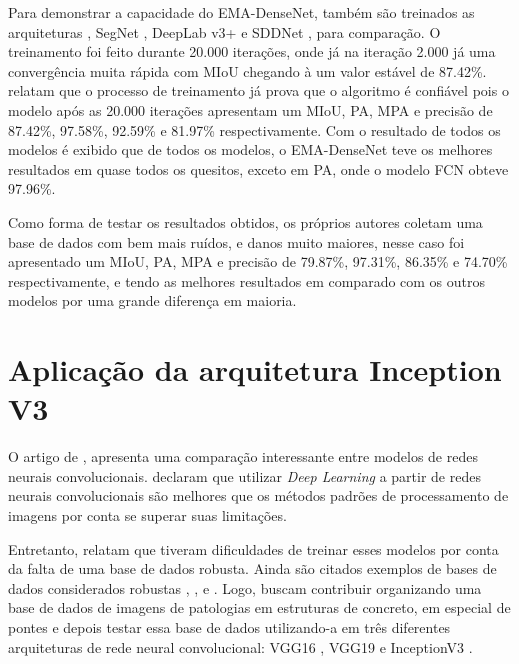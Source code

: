 Para demonstrar a capacidade do EMA-DenseNet, também são treinados as arquiteturas  \cite{yang2018automatic}, SegNet \cite{badrinarayanan2017segnet}, DeepLab v3+ \cite{chen2018encoder} e SDDNet \cite{choi2019sddnet}, para comparação. O treinamento  foi feito durante 20.000 iterações, onde já na iteração 2.000 já uma convergência muita rápida com MIoU chegando à um valor estável de 87.42\%. 
 relatam que o processo de treinamento já prova que o algoritmo é confiável pois o modelo após as 20.000 iterações apresentam um MIoU, PA, MPA e precisão de 87.42\%, 97.58\%, 92.59\% e 81.97\% respectivamente. 
Com o resultado de todos os modelos é exibido que de todos os modelos, o EMA-DenseNet teve os melhores resultados em quase todos os quesitos, exceto em PA, onde o modelo FCN obteve 97.96\%.

Como forma de testar os resultados obtidos, os próprios autores coletam uma base de dados com bem mais ruídos, e danos muito maiores, nesse caso foi apresentado um MIoU, PA, MPA e precisão de 79.87\%, 97.31\%, 86.35\% e 74.70\% respectivamente, e tendo as melhores resultados em comparado com os outros modelos por uma grande diferença em maioria.


\section{Aplicação da arquitetura Inception V3}


O artigo de , apresenta uma comparação interessante entre modelos de redes neurais convolucionais. 
 declaram que utilizar \textit{Deep Learning} a partir de redes neurais convolucionais são melhores que os métodos padrões de processamento de imagens por conta se superar suas limitações.

Entretanto,  relatam que tiveram dificuldades de treinar esses modelos por conta da falta de uma base de dados robusta. 
Ainda são citados exemplos de bases de dados considerados robustas , ,  e .
Logo,  buscam contribuir organizando uma base de dados de imagens de patologias em estruturas de concreto, em especial de pontes e depois testar essa base de dados utilizando-a em três diferentes arquiteturas de rede neural convolucional: VGG16 \cite{simonyan2014very}, VGG19 \cite{simonyan2014very} e InceptionV3 \cite{szegedy2015going}.

